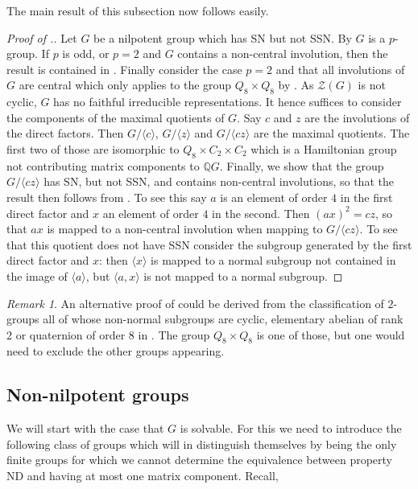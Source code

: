 \documentclass[a4paper,10pt]{amsart}
\theoremstyle{definition}
\theoremstyle{remark}
\newtheorem{remark}[lemma]{Remark}
\newcommand{\ZZ}{\mathcal{Z}}
\begin{document}
The main result of this subsection now follows easily.
\begin{proof}[Proof of .]
Let $G$ be a nilpotent group which has SN but not SSN. By  $G$ is a $p$-group. If $p$ is odd, or $p=2$ and $G$ contains a non-central involution, then the result is contained in . Finally consider the case $p=2$ and that all involutions of $G$ are central which only applies to the group $Q_8 \times Q_8$ by .  As $\ZZ(G)$ is not cyclic, $G$ has no faithful irreducible representations. It hence suffices to consider the components of the maximal quotients of $G$. Say $c$ and $z$ are the involutions of the direct factors. Then $G/\langle c \rangle$, $G/\langle z \rangle$ and $G/\langle cz \rangle$ are the maximal quotients. The first two of those are isomorphic to $Q_8 \times C_2 \times C_2$ which is a Hamiltonian group not contributing matrix components to $\mathbb{Q}G$. Finally, we show that the group $G/\langle cz \rangle$ has SN, but not SSN, and contains non-central involutions, so that the result then follows from . To see this say $a$ is an element of order $4$ in the first direct factor and $x$ an element of order $4$ in the second. Then $(ax)^2 = cz$, so that $ax$ is mapped to a non-central involution when mapping to $G/\langle cz \rangle$. To see that this quotient does not have SSN consider the subgroup generated by the first direct factor and $x$: then $\langle x \rangle$ is mapped to a normal subgroup not contained in the image of $\langle a \rangle$, but $\langle a,x  \rangle$ is not mapped to a normal subgroup. 
\end{proof}

\begin{remark}
An alternative proof of  could be derived from the classification of $2$-groups all of whose non-normal subgroups are cyclic, elementary abelian of rank 2 or quaternion of order $8$ in \cite[Section 175]{BerkovichJankoVol4}. The group $Q_8 \times Q_8$ is one of those, but one would need to exclude the other groups appearing.
\end{remark}


\subsection{Non-nilpotent groups}

We will start with the case that $G$ is solvable. For this we need to introduce the following class of groups which will in  distinguish themselves by being the only finite groups for which we cannot determine the equivalence between property ND and having at most one matrix component. Recall,
\end{document}

